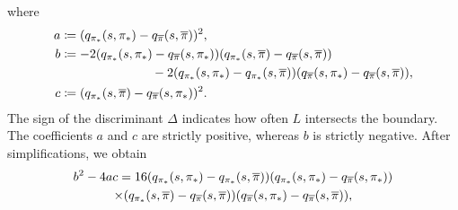 where
\begin{align*}
    a 
    &\coloneqq (q_{{\pi}_*}(s, {\pi}_*) - q_{\overline{\pi}}(s, \overline{\pi}))^2 ,
    \\
    b 
    &\coloneqq -2 ( q_{{\pi}_*}(s, {\pi}_*) - q_{\overline{\pi}}(s, {\pi}_*))( q_{{\pi}_*}(s, \overline{\pi}) - q_{\overline{\pi}}(s, \overline{\pi}))
    \\
    &\hspace{2.55cm} -2 ( q_{{\pi}_*}(s, {\pi}_*) - q_{{\pi}_*}(s, \overline{\pi})) ( q_{\overline{\pi}}(s, {\pi}_*) - q_{\overline{\pi}}(s, \overline{\pi})) ,
    \\
    c 
    &\coloneqq (q_{{\pi}_*}(s, \overline{\pi}) - q_{\overline{\pi}}(s, {\pi}_*))^2 .
\end{align*}
% 
% 
The sign of the discriminant $\Delta$ indicates how often $L$ intersects the boundary.
The coefficients $a$ and $c$ are strictly positive, whereas $b$ is strictly negative.
After simplifications, we obtain
\begin{multline*}
    b^2 - 4ac 
    = 16(q_{{\pi}_*}(s, {\pi}_*) - q_{{\pi}_*}(s, \overline{\pi}))
    (q_{{\pi}_*}(s, {\pi}_*) - q_{\overline{\pi}}(s, {\pi}_*))
    \\
    \times (q_{{\pi}_*}(s, \overline{\pi}) - q_{\overline{\pi}}(s, \overline{\pi}))
    (q_{\overline{\pi}}(s, {\pi}_*) - q_{\overline{\pi}}(s, \overline{\pi})) ,
\end{multline*}
